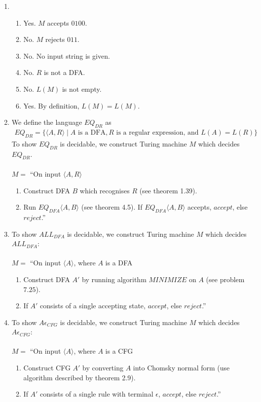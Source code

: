 \documentclass[11pt]{article}
\begin{document}
\begin{enumerate}[label=4.\arabic*]
  \item
  \begin{enumerate}
    \item Yes. $M$ accepts $0100$.
    \item No. $M$ rejects $011$.
    \item No. No input string is given.
    \item No. $R$ is not a DFA.
    \item No. $L(M)$ is not empty.
    \item Yes. By definition, $L(M) = L(M)$.
  \end{enumerate}
  \item We define the language $EQ_{DR}$ as
    \begin{align*}
      EQ_{DR} = \{ \langle A, R \rangle \mid A \text{ is a DFA}, R \text{ is a regular expression, and } L(A) = L(R) \}
    \end{align*}
    To show $EQ_{DR}$ is decidable, we construct Turing machine $M$ which decides $EQ_{DR}$. \\\\
    $M =$ ``On input $\langle A, R \rangle$
    \begin{enumerate}[label=\arabic*.]
      \item Construct DFA $B$ which recognises $R$ (see theorem 1.39).
      \item Run $EQ_{DFA}\langle A, B \rangle$ (see theorem 4.5). If $EQ_{DFA}\langle A, B \rangle$ accepts, $accept$, else $reject$.''
    \end{enumerate}
    \item To show $ALL_{DFA}$ is decidable, we construct Turing machine $M$ which decides $ALL_{DFA}$: \\\\
    $M =$ ``On input $\langle A \rangle$, where $A$ is a DFA
    \begin{enumerate}[label=\arabic*.]
      \item Construct DFA $A'$ by running algorithm $MINIMIZE$ on $A$ (see problem $7.25$).
      \item If $A'$ consists of a single accepting state, $accept$, else $reject$.''
    \end{enumerate}
    \item To show $A\epsilon_{CFG}$ is decidable, we construct Turing machine $M$ which decides $A\epsilon_{CFG}$: \\\\
    $M =$ ``On input $\langle A \rangle$, where $A$ is a CFG
    \begin{enumerate}[label=\arabic*.]
      \item Construct CFG $A'$ by converting $A$ into Chomsky normal form (use algorithm described by theorem 2.9).
      \item If $A'$ consists of a single rule with terminal $\epsilon$, $accept$, else $reject$.''
    \end{enumerate}
  \end{enumerate}
\end{document}
